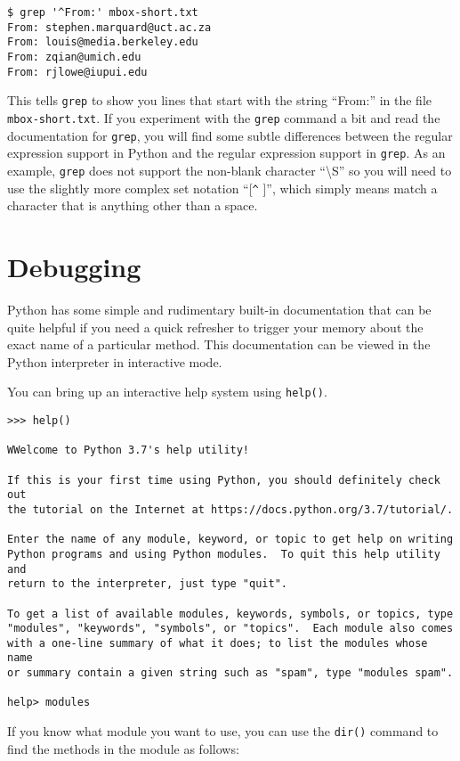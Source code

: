 \beforeverb
\begin{verbatim}
$ grep '^From:' mbox-short.txt
From: stephen.marquard@uct.ac.za
From: louis@media.berkeley.edu
From: zqian@umich.edu
From: rjlowe@iupui.edu
\end{verbatim}
\afterverb
%
This tells {\tt grep} to show you lines that start with the string ``From:'' in the file
{\tt mbox-short.txt}.   If you experiment with the {\tt grep} command a bit and read the
documentation for {\tt grep}, you will find some subtle differences between the regular
expression support in Python and the regular expression support in {\tt grep}.  As an example,
{\tt grep} does not support the non-blank character ``{\textbackslash}S'' so you will need to
use the slightly more complex set notation ``[\verb"^" ]'', which simply means match a 
character that is anything other than a space.

\section{Debugging}

Python has some simple and rudimentary built-in documentation that can be quite helpful if
you need a quick refresher to trigger your memory about the exact name of a particular method.
This documentation can be viewed in the Python interpreter in interactive mode.

You can bring up an interactive help system using {\tt help()}.

\beforeverb
\begin{verbatim}
>>> help()

WWelcome to Python 3.7's help utility!

If this is your first time using Python, you should definitely check out
the tutorial on the Internet at https://docs.python.org/3.7/tutorial/.

Enter the name of any module, keyword, or topic to get help on writing
Python programs and using Python modules.  To quit this help utility and
return to the interpreter, just type "quit".

To get a list of available modules, keywords, symbols, or topics, type
"modules", "keywords", "symbols", or "topics".  Each module also comes
with a one-line summary of what it does; to list the modules whose name
or summary contain a given string such as "spam", type "modules spam".

help> modules
\end{verbatim}
\afterverb
%
If you know what module you want to use, you can use the {\tt dir()} command to find the methods in the module as follows:

